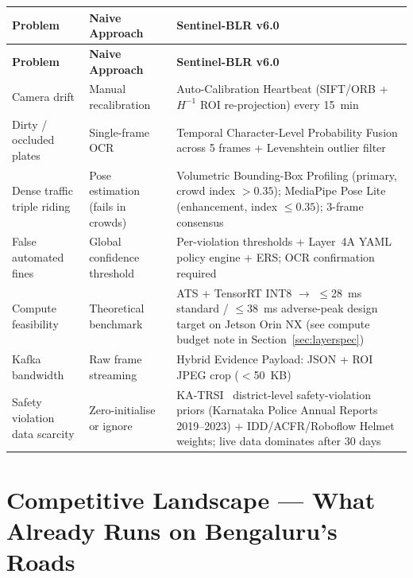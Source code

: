 \documentclass[11pt,a4paper]{article}
\begin{document}
\begin{longtable}{L{3.2cm} L{4.5cm} L{7cm}}
    \toprule
    \color{white}\textbf{Problem} & \color{white}\textbf{Naive Approach} & \color{white}\textbf{Sentinel-BLR v6.0} \\
    \midrule
    \endfirsthead
    \toprule
    \color{white}\textbf{Problem} & \color{white}\textbf{Naive Approach} & \color{white}\textbf{Sentinel-BLR v6.0} \\
    \midrule
    \endhead
    \bottomrule
    \endfoot

    Camera drift & Manual recalibration & Auto-Calibration Heartbeat (SIFT/ORB + $H^{-1}$ ROI re-projection) every 15~min \\
    Dirty / occluded plates & Single-frame OCR & Temporal Character-Level Probability Fusion across 5 frames + Levenshtein outlier filter \\
    Dense traffic triple riding & Pose estimation (fails in crowds) & Volumetric Bounding-Box Profiling (primary, crowd index $> 0.35$); MediaPipe Pose Lite (enhancement, index $\leq 0.35$); 3-frame consensus \\
    False automated fines & Global confidence threshold & Per-violation thresholds + Layer~4A YAML policy engine + ERS; OCR confirmation required \\
    Compute feasibility & Theoretical benchmark & ATS + TensorRT INT8 $\rightarrow$ $\leq$28~ms standard / $\leq$38~ms adverse-peak design target on Jetson Orin NX (see compute budget note in Section~\ref{sec:layerspec}) \\
    Kafka bandwidth & Raw frame streaming & Hybrid Evidence Payload: JSON + ROI JPEG crop ($<$50~KB) \\
    Safety violation data scarcity & Zero-initialise or ignore & KA-TRSI~\cite{katrsi2023} district-level safety-violation priors (Karnataka Police Annual Reports 2019--2023) + IDD/ACFR/Roboflow Helmet weights; live data dominates after 30 days \\
\end{longtable}

\section{Competitive Landscape — What Already Runs on Bengaluru's Roads}
\label{sec:competitive}
\end{document}
